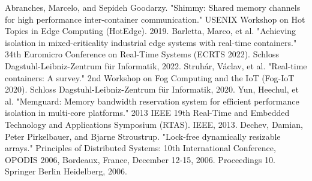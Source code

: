 \documentclass[a4paper, 10pt]{article}
\theoremstyle{nonumberplain}
\begin{document}
% 

\begin{thebibliography}{2}
     Abranches, Marcelo, and Sepideh Goodarzy.
        "Shimmy: Shared memory channels for high performance inter-container
        communication." USENIX Workshop on Hot Topics in Edge Computing
        (HotEdge). 2019.
        Barletta, Marco, et al. "Achieving isolation in mixed-criticality
        industrial edge systems with real-time containers." 34th Euromicro
        Conference on Real-Time Systems (ECRTS 2022). Schloss
        Dagstuhl-Leibniz-Zentrum für Informatik, 2022.
        Struhár, Václav, et al. "Real-time containers: A survey."
        2nd Workshop on Fog Computing and the IoT (Fog-IoT 2020).
        Schloss Dagstuhl-Leibniz-Zentrum für Informatik, 2020.
        Yun, Heechul, et al.
        "Memguard: Memory bandwidth reservation system
        for efficient performance isolation in multi-core
        platforms." 2013 IEEE 19th Real-Time and Embedded
        Technology and Applications Symposium (RTAS). IEEE, 2013.
        Dechev, Damian, Peter Pirkelbauer, and Bjarne Stroustrup.
        "Lock-free dynamically resizable arrays."
        Principles of Distributed Systems: 10th International Conference,
        OPODIS 2006, Bordeaux, France, December 12-15, 2006. Proceedings 10.
        Springer Berlin Heidelberg, 2006.
\end{thebibliography}
\end{document}
